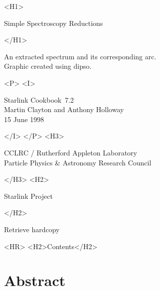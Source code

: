 \documentclass[twoside,11pt]{article}
\newcommand{\stardoccategory}  {Starlink Cookbook}
\newcommand{\stardocsource}    {sc\stardocnumber}
\newcommand{\stardocnumber}    {7.2}
\newcommand{\stardocauthors}   {Martin Clayton and Anthony Holloway}
\newcommand{\stardocdate}      {15 June 1998}
\newcommand{\stardoctitle}     {Simple Spectroscopy Reductions}
\newcommand{\htmladdnormallink}[2]{#1}
\newcommand{\htmladdimg}[1]{}
\newcommand{\htmlref}[2]{#1}
\newcommand{\htmladdtonavigation}[1]{}
\newcommand{\xref}[3]{#1}
\newcommand{\xlabel}[1]{}
\begin{document}
\begin{htmlonly}
   \xlabel{}
   \begin{rawhtml} <H1> \end{rawhtml}
      \stardoctitle\\
   \begin{rawhtml} </H1> \end{rawhtml}

   \begin{figure}[h]
   \epsfysize=100mm
   \end{figure}

   An extracted spectrum and its corresponding arc.\\
   Graphic created using \xref{{\sc dipso}}{sun50}{}\cite{dipso}.

   \begin{rawhtml} <P> <I> \end{rawhtml}
   \stardoccategory\ \stardocnumber \\
   \stardocauthors \\
   \stardocdate
   \begin{rawhtml} </I> </P> <H3> \end{rawhtml}
      \htmladdnormallink{CCLRC}{http://www.cclrc.ac.uk} /
      \htmladdnormallink{Rutherford Appleton Laboratory}
                        {http://www.cclrc.ac.uk/ral} \\
      \htmladdnormallink{Particle Physics \& Astronomy Research Council}
                        {http://www.pparc.ac.uk} \\
   \begin{rawhtml} </H3> <H2> \end{rawhtml}
      \htmladdnormallink{Starlink Project}{http://www.starlink.ac.uk/}
   \begin{rawhtml} </H2> \end{rawhtml}
   \htmladdnormallink{\htmladdimg{source.gif} Retrieve hardcopy}
      {http://www.starlink.ac.uk/cgi-bin/hcserver?\stardocsource}\\

  \label{stardoccontents}
  \begin{rawhtml}
    <HR>
    <H2>Contents</H2>
  \end{rawhtml}
  \htmladdtonavigation{\htmlref{\htmladdimg{contents_motif.gif}}
        {stardoccontents}}

  \section{\xlabel{abstract}Abstract}
\end{htmlonly}
\end{document}
